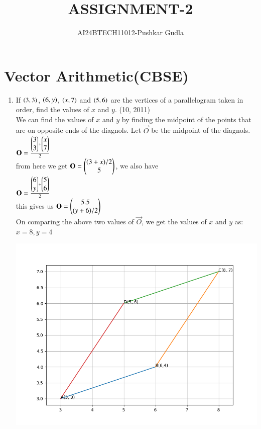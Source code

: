 \documentclass[journal,12pt,onecolumn]{IEEEtran}
\theoremstyle{remark}
\begin{document}

\vspace{3cm}

\title{ASSIGNMENT-2}
\author{AI24BTECH11012-Pushkar Gudla}
\maketitle
\bigskip
\section*{\textbf{Vector Arithmetic(CBSE)}}
\begin{enumerate}
	\item If $\left(3,3\right)$, $\left(6,y\right)$, $\left(x,7\right)$ and $\left(5,6\right)$ are the vertices of a parallelogram taken in order, find the values of $x$ and $y$. 
		\hfill{(10, 2011)}\\

		\solution We can find the values of $x$ and $y$ by finding the midpoint of the points that are on opposite ends of the diagnols. Let $\vec{O}$ be the midpoint of the diagnols.\\

		$\mathbf{O}=\frac{\begin{pmatrix}3\\3\end{pmatrix}+\begin{pmatrix}x\\7\end{pmatrix}}{2}$\\
		from here we get $\mathbf{O}=\begin{pmatrix}(3+x)/2 \\ 5\end{pmatrix}$, we also have\\
		$\mathbf{O}=\frac{\begin{pmatrix}6\\y\end{pmatrix}+\begin{pmatrix}5\\6\end{pmatrix}}{2}$\\
		this gives us $\mathbf{O}=\begin{pmatrix}5.5\\(y+6)/2\end{pmatrix}$\\
		On comparing the above two values of $\vec{O}$, we get the values of $x$ and $y$ as:\\
		$x=8, y=4$\\
\graphicspath{ {./figs/} }
		\includegraphics[scale=0.7]{parallelogram}
\end{enumerate}
\end{document}
